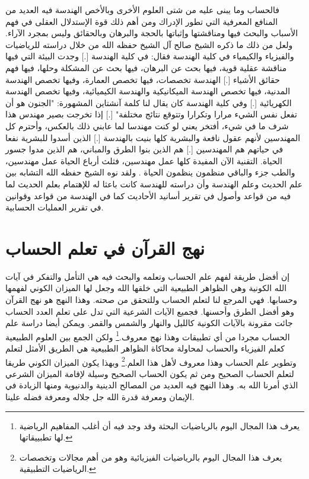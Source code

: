 فالحساب وما يبنى عليه من شتى العلوم الأخرى وبالأخص الهندسة فيه العديد من المنافع المعرفية التي تطور الإدراك ومن أهم ذلك قوة الإستدلال العقلى في فهم الأسباب والبحث فيها ومناقشتها وإثباتها بالحجة والبرهان وبالحقائق وليس بمجرد الآراء. ولعل من ذلك ما ذكره الشيخ صالح آل الشيخ حفظه الله من خلال دراسته للرياضيات والفيزياء والكيمياء في كلية الهندسة فقال: في كلية الهندسة [.] وجدت البيئة التي فيها مناقشة عقلية قوية، فيها بحث عن البرهان، فيها بحث عن المشكلة وحلها، فيها فهم حقائق الأشياء [.] الهندسة تخصصات، فيها تخصص العمارة، وفيها تخصص الهندسة المدنية، فيها تخصص الهندسة الميكانيكية والهندسة الكيميائية، وفيها تخصص الهندسة الكهريائية [.] وفي كلية الهندسة كان يقال لنا كلمة آنشتاين المشهورة: "الجنون هو أن تفعل نفس الشيء مرارا وتكرارا وتتوقع نتائج مختلفة" [.] إذا تخرجت بصير مهندس هذا شرف ما في شيء، أفتخر يعني لو كنت مهندسا لما عابني ذلك بالعكس، وأحترم كل المهندسين لأنهم عقول نافعة والبشرية كلها بنيت بالهندسة [.] الذين أسدوا للبشرية نفعا في حياتهم هم المهندسين [.] هم الذين بنوا الطرق والمباني، هم الذين مدوا جسور الحياة. التقنية الآن المفيدة كلها عمل مهندسين، فثلث أرباع الحياة عمل مهندسين، والطب جزء والباقي منظمون ينظمون الحياة \href{https://www.youtube.com/watch?v=kw_s0K_zbqc}{\faExternalLink}. ولقد نوه الشيخ حفظه الله التشابه بين علم الحديث وعلم الهندسة وأن دراسته للهندسة كانت باعثا له للإهتمام بعلم الحديث لما فيه من قواعد وأصول في تقرير أسانيد الأحاديث كما في الهندسة من قواعد وقوانين في تقرير العمليات الحسابية.

\section{نهج القرآن في تعلم الحساب}

إن أفضل طريقة لفهم علم الحساب وتعلمه والبحث فيه هي التأمل والتفكر في آيات الله الكونية وهي الظواهر الطبيعية التي خلقها الله وجعل لها الميزان الكوني لفهمها وحسابها. فهي المرجع لنا لتعلم الحساب وللتحقق من صحته. وهذا النهج هو نهج القرآن وهو أفضل الطرق وأحسنها. فجميع الآيات الشرعية التي تدل على تعلم العدد الحساب جائت مقرونة بالآيات الكونية كالليل والنهار والشمس والقمر. ويمكن أيضا دراسة علم الحساب مجردا من أي تطبيقات وهذا نهج معروف.\footnote{يعرف هذا المجال اليوم بالرياضيات البحثة وقد وجد فيه أن أغلب المفاهيم الرياضية لها تطبييقاتها.} ولكن الجمع بين العلوم الطبيعية كعلم الفيزياء والحساب لمحاولة محاكاة الظواهر الطبيعية هي الطريق الأمثل لتعلم وتطوير علم الحساب وهذا معروف لأهل هذا العلم.\footnote{يعرف هذا المجال اليوم بالرياضيات الفيزيائية وهو من أهم مجالات وتخصصات الرياضيات التطبيقية.} وبهذا يكون الميزان الكوني طريقا لتعلم الحساب الصحيح ومن ثم يكون الحساب الصحيح وسيلة لإقامة الميزان الشرعي الذي أمرنا الله به. وهذا النهج فيه العديد من المصالح الدينية والدنيوية ومنها الزيادة في الإيمان ومعرفة قدرة الله جل جلاله ومعرفة فضله علينا.

